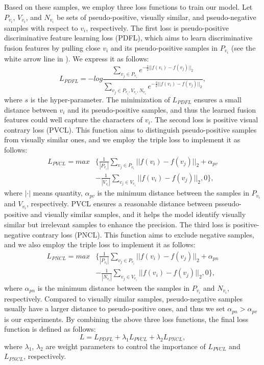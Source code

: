 \documentclass[10pt,twocolumn,letterpaper]{article}
\begin{document}
Based on these samples, we employ three loss functions to train our model.
Let $P_{v_i}$, $V_{v_i}$, and $N_{v_i}$ be sets of pseudo-positive, visually similar, and pseudo-negative samples with respect to $v_i$, respectively.
The first loss is pseudo-positive discriminative feature learning loss (PDFL), which aims to learn discriminative fusion features by pulling close $v_i$ and its pseudo-positive samples in $P_{v_i}$ (see the white arrow line in ).
We express it as follows:
\begin{equation} \label{equ:pdfl}
L_{PDFL}=-log \frac{\sum_{v_j \in P_{v_i}} e^{-\frac{s}{2}||f(v_i)-f(v_j)||_2 }}{\sum_{v_j \in P_{v_i}, V_{v_i}, N_{v_i} } e^{-\frac{s}{2} ||f(v_i)-f(v_j)||_2 } }, 
\end{equation}
where $s$ is the hyper-parameter.
The minimization of $L_{PDFL}$ ensures a small distance between $v_i$ and its pseudo-positive samples,
and thus the learned fusion features could well capture the characters of $v_i$.
The second loss is positive visual contrary loss (PVCL).
This function aims to distinguish pseudo-positive samples from visually similar ones, 
and we employ the triple loss to implement it as follows:
\begin{equation} \label{equ:pvcl}
\begin{aligned}
L_{PVCL}=max&\{ \frac{1}{|P_{v_i}|} \sum_{v_j \in P_{v_i} } ||f(v_i)-f(v_j)||_2 +\alpha_{pv} \\
&-\frac{1}{|V_{v_i}|} \sum_{v_j \in V_{v_i}} ||f(v_i)-f(v_j)||_2 , 0 \},
\end{aligned} 
\end{equation}
where $|\cdot|$ means quantity, $\alpha_{pv}$ is the minimum distance between the samples in $P_{v_i}$ and $V_{v_i}$, respectively.
PVCL ensures a reasonable distance between psseudo-positive and visually similar samples, 
and it helps the model identify visually similar but irrelevant samples to enhance the precision.
The third loss is positive-negative contrary loss (PNCL).
This function aims to exclude negative samples, 
and we also employ the triple loss to implement it as follows:
\begin{equation} \label{equ:pncl}
\begin{aligned}
L_{PNCL}=max&\{ \frac{1}{|P_{v_i}|} \sum_{v_j \in P_{v_i} } ||f(v_i)-f(v_j)||_2 +\alpha_{pn} \\
&-\frac{1}{|N_{v_i}|} \sum_{v_j \in V_{v_i}} ||f(v_i)-f(v_j)||_2 , 0 \},
\end{aligned} 
\end{equation}
where $\alpha_{pn}$ is the minimum distance between the samples in $P_{v_i}$ and $N_{v_i}$, respectively.
Compared to visually similar samples, pseudo-negative samples usually have a larger distance to pseudo-positive ones, 
and thus we set $\alpha_{pn} > \alpha_{pv}$ is our experiments. 
By combining the above three loss functions, the final loss function is defined as follows:
\begin{equation} \label{equ:final_loss}
L = L_{PDFL} + \lambda_1 L_{PVCL} + \lambda_2 L_{PNCL},
\end{equation}
where $\lambda_1$, $\lambda_2$ are weight parameters to control the importance of $L_{PVCL}$ and $L_{PNCL}$, respectively.
\end{document}
